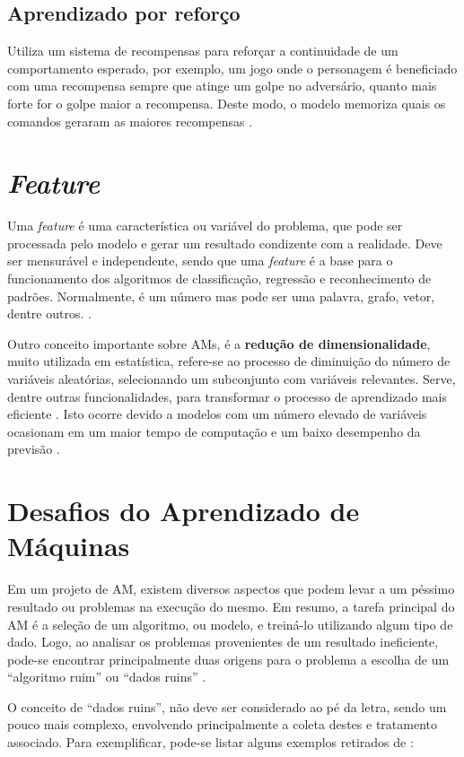 \subsection{Aprendizado por reforço}
Utiliza um sistema de recompensas para reforçar a continuidade de um comportamento esperado, por exemplo, um jogo onde o personagem é beneficiado com uma recompensa sempre que atinge um golpe no adversário, quanto mais forte for o golpe maior a recompensa. Deste modo, o modelo memoriza quais os comandos geraram as maiores recompensas \cite{kirk2014thoughtful}.

\section{\textit{Feature}} 
Uma \textit{feature} é uma característica ou variável do problema, que pode ser processada pelo modelo e gerar um resultado condizente com a realidade. Deve ser mensurável e independente, sendo que uma \textit{feature} é a base para o funcionamento dos algoritmos de classificação, regressão e reconhecimento de padrões. Normalmente, é um número mas pode ser uma palavra, grafo, vetor, dentre outros. \cite{chandrashekar2014survey}.

Outro conceito importante sobre AMs, é a \textbf{redução de dimensionalidade}, muito utilizada em estatística, refere-se ao processo de diminuição do número de variáveis aleatórias, selecionando um subconjunto com variáveis relevantes. Serve, dentre outras funcionalidades, para transformar o processo de aprendizado mais eficiente \cite{borges2006reduccao}. Isto ocorre devido a modelos com um número elevado de variáveis ocasionam em um maior tempo de computação e um baixo desempenho da previsão \cite{chandrashekar2014survey}.

\section{Desafios do Aprendizado de Máquinas}
Em um projeto de AM, existem diversos aspectos que podem levar a um péssimo resultado ou problemas na execução do mesmo. Em resumo, a tarefa principal do AM é a seleção de um algoritmo, ou modelo, e treiná-lo utilizando algum tipo de dado. Logo, ao analisar os problemas provenientes de um resultado ineficiente, pode-se encontrar principalmente duas origens para o problema a escolha de um “algoritmo ruim” ou “dados ruins” \cite{geron2017hands}.

O conceito de “dados ruins”, não deve ser considerado ao pé da letra, sendo um pouco mais complexo, envolvendo principalmente a coleta destes e tratamento associado. Para exemplificar,  pode-se listar alguns exemplos retirados de \cite{geron2017hands}:

